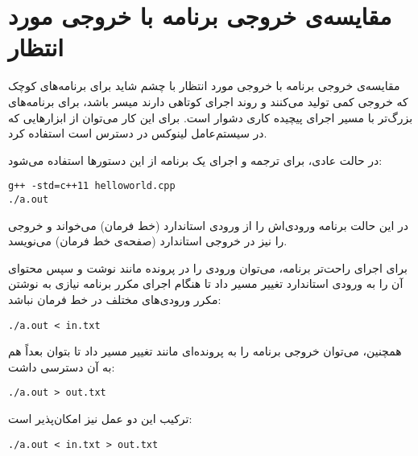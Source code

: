\documentclass{utap}
\begin{document}
    \appendix

    \section{مقایسه‌ی خروجی برنامه با خروجی مورد انتظار\label{sec:diff}}

    مقایسه‌ی خروجی برنامه با خروجی مورد انتظار با چشم شاید برای برنامه‌های کوچک که خروجی کمی تولید می‌کنند و روند اجرای کوتاهی دارند میسر باشد، برای برنامه‌های بزرگ‌تر با مسیر اجرای پیچیده کاری دشوار است. برای این کار می‌توان از ابزارهایی که در سیستم‌عامل لینوکس در دسترس است استفاده کرد.

    در حالت عادی، برای ترجمه و اجرای یک برنامه از این دستورها استفاده می‌شود:
    \begin{latin}%
    \begin{Verbatim}[fontsize=\small]
g++ -std=c++11 helloworld.cpp
./a.out
    \end{Verbatim}
    \end{latin}

    در این حالت برنامه ورودی‌اش را از ورودی استاندارد  (خط فرمان) می‌خواند و خروجی را نیز در خروجی استاندارد  (صفحه‌ی خط فرمان) می‌نویسد.

    برای اجرای راحت‌تر برنامه، می‌توان ورودی را در پرونده مانند  نوشت و سپس محتوای آن را به ورودی استاندارد تغییر مسیر داد تا هنگام اجرای مکرر برنامه نیازی به نوشتن مکرر ورودی‌های مختلف در خط فرمان نباشد:
    \begin{latin}%
    \begin{Verbatim}[fontsize=\small]
./a.out < in.txt
    \end{Verbatim}
    \end{latin}

    همچنین، می‌توان خروجی برنامه را به پرونده‌ای مانند  تغییر مسیر داد تا بتوان بعداً هم به آن دسترسی داشت:
    \begin{latin}%
    \begin{Verbatim}[fontsize=\small]
./a.out > out.txt
    \end{Verbatim}
    \end{latin}

    ترکیب این دو عمل نیز امکان‌پذیر است:
    \begin{latin}%
    \begin{Verbatim}[fontsize=\small]
./a.out < in.txt > out.txt
    \end{Verbatim}
    \end{latin}
\end{document}
